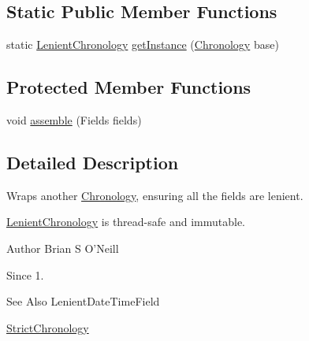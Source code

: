 \subsection*{Static Public Member Functions}
\begin{DoxyCompactItemize}
\item 
static \hyperlink{classorg_1_1joda_1_1time_1_1chrono_1_1_lenient_chronology}{Lenient\-Chronology} \hyperlink{classorg_1_1joda_1_1time_1_1chrono_1_1_lenient_chronology_a7437ea3cbe18f92927e5ff314cb3035a}{get\-Instance} (\hyperlink{classorg_1_1joda_1_1time_1_1_chronology}{Chronology} base)
\end{DoxyCompactItemize}
\subsection*{Protected Member Functions}
\begin{DoxyCompactItemize}
\item 
void \hyperlink{classorg_1_1joda_1_1time_1_1chrono_1_1_lenient_chronology_a53bc950a1b0a270a161e678eed43cea0}{assemble} (Fields fields)
\end{DoxyCompactItemize}


\subsection{Detailed Description}
Wraps another \hyperlink{classorg_1_1joda_1_1time_1_1_chronology}{Chronology}, ensuring all the fields are lenient. 

\hyperlink{classorg_1_1joda_1_1time_1_1chrono_1_1_lenient_chronology}{Lenient\-Chronology} is thread-\/safe and immutable.

\begin{DoxyAuthor}{Author}
Brian S O'Neill 
\end{DoxyAuthor}
\begin{DoxySince}{Since}
1. 
\end{DoxySince}
\begin{DoxySeeAlso}{See Also}
Lenient\-Date\-Time\-Field 

\hyperlink{classorg_1_1joda_1_1time_1_1chrono_1_1_strict_chronology}{Strict\-Chronology} 
\end{DoxySeeAlso}



